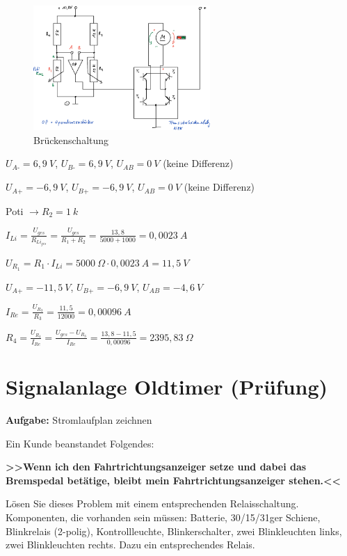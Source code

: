 \begin{figure}[!ht]%
\centering
\includegraphics[width=0.6\textwidth]{images/Skizze/28_FT_Brueckenschaltung.pdf}
\caption{Brückenschaltung}
\end{figure}

$U_{A\text{-}} = 6,9~V$, $U_{B\text{-}} = 6,9~V$, $U_{AB} = 0~V$
(keine Differenz)

$U_{A\text{+}} = -6,9~V$, $U_{B\text{+}} = -6,9~V$, $U_{AB} = 0~V$
(keine Differenz)

Poti $\to R_2 = 1~k$

$I_{Li} = \frac{U_{ges}}{R_{{Li}_{ges}}} = \frac{U_{ges}}{R_1 + R_2} = \frac{13,8}{5000 + 1000} =0,0023~A$

$U_{R_1} = R_1 \cdot I_{Li} = 5000~\Omega \cdot 0,0023~A = 11,5~V$

$U_{A\text{+}} = -11,5~V$, $U_{B\text{+}} = -6,9~V$,
$U_{AB} = -4,6~V$

$I_{Re} = \frac{U_{R_3}}{R_3} = \frac{11,5}{12000} =0,00096~A$

$R_4 = \frac{U_{R_4}}{I_{Re}} = \frac{U_{ges} - U_{R_3}}{I_{Re}} = \frac{13,8 - 11,5}{0,00096} = 2395,83~\Omega$

\newpage

\section{Signalanlage Oldtimer
(Prüfung)}\label{signalanlage-oldtimer-pruefung}

\textbf{Aufgabe:} Stromlaufplan zeichnen

Ein Kunde beanstandet Folgendes:

\textbf{>>Wenn ich den Fahrtrichtungsanzeiger setze und dabei das
Bremspedal betätige, bleibt mein Fahrtrichtungsanzeiger stehen.<<}

Lösen Sie dieses Problem mit einem entsprechenden Relaisschaltung.
Komponenten, die vorhanden sein müssen: Batterie, 30/15/31ger Schiene,
Blinkrelais (2-polig), Kontrollleuchte, Blinkerschalter, zwei
Blinkleuchten links, zwei Blinkleuchten rechts. Dazu ein entsprechendes
Relais.

